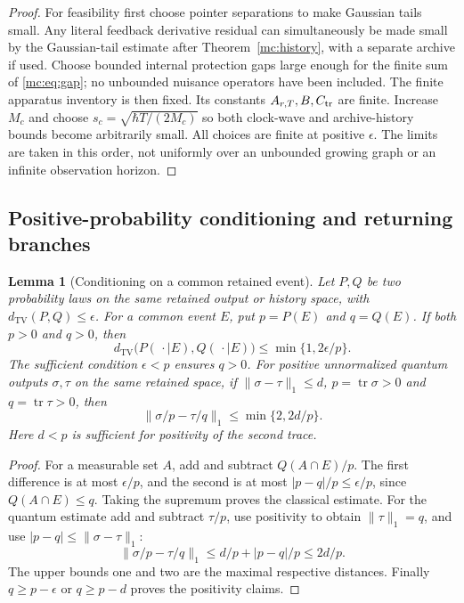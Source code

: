 \documentclass[11pt,oneside,openany]{book}
\newtheorem{lemma}[theorem]{Lemma}
\theoremstyle{definition}
\theoremstyle{remark}\newtheorem{remark}[theorem]{Remark}
\providecommand{\tr}{\operatorname{tr}}
\providecommand{\TV}{d_{\mathrm{TV}}}
\begin{document}
\begin{proof}
For feasibility first choose pointer separations to make Gaussian tails small. Any literal feedback derivative residual can simultaneously be made small by the Gaussian-tail estimate after Theorem~\ref{mc:history}, with a separate archive if used. Choose bounded internal protection gaps large enough for the finite sum of \eqref{mc:eq:gap}; no unbounded nuisance operators have been included. The finite apparatus inventory is then fixed. Its constants $A_{r,T},B,C_{\rm tr}$ are finite. Increase $M_c$ and choose $s_c=\sqrt{\hbar T/(2M_c)}$ so both clock-wave and archive-history bounds become arbitrarily small. All choices are finite at positive $\epsilon$. The limits are taken in this order, not uniformly over an unbounded growing graph or an infinite observation horizon.
\end{proof}

\subsection{Positive-probability conditioning and returning branches}
\label{mc:conditioning}

\begin{lemma}[Conditioning on a common retained event]
\label{mc:conditional-bound}
Let $P,Q$ be two probability laws on the same retained output or history
space, with $\TV(P,Q)\le\epsilon$. For a common event $E$, put
$p=P(E)$ and $q=Q(E)$. If \emph{both} $p>0$ and $q>0$, then
\[
 \TV\bigl(P(\,\cdot\mid E),Q(\,\cdot\mid E)\bigr)
 \le \min\{1,2\epsilon/p\}.
\]
The sufficient condition $\epsilon<p$ ensures $q>0$. For positive
unnormalized quantum outputs $\sigma,\tau$ on the same retained space,
if $\|\sigma-\tau\|_1\le d$, $p=\tr\sigma>0$ and $q=\tr\tau>0$, then
\[
 \|\sigma/p-\tau/q\|_1\le\min\{2,2d/p\}.
\]
Here $d<p$ is sufficient for positivity of the second trace.
\end{lemma}
\begin{proof}
For a measurable set $A$, add and subtract $Q(A\cap E)/p$.
The first difference is at most $\epsilon/p$, and the second is at most
$|p-q|/p\le\epsilon/p$, since $Q(A\cap E)\le q$.
Taking the supremum proves the classical estimate. For the quantum
estimate add and subtract $\tau/p$, use positivity to obtain
$\|\tau\|_1=q$, and use
$|p-q|\le\|\sigma-\tau\|_1$:
\[
 \|\sigma/p-\tau/q\|_1
 \le d/p+|p-q|/p\le2d/p.
\]
The upper bounds one and two are the maximal respective distances.
Finally $q\ge p-\epsilon$ or $q\ge p-d$ proves the positivity claims.
\end{proof}
\end{document}
